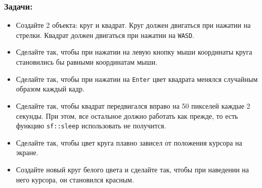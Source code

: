 \documentclass{article}
\begin{document}
\subsubsection*{Задачи:}
\begin{itemize}
\item Создайте 2 объекта: круг и квадрат. Круг должен двигаться при нажатии на стрелки. Квадрат должен двигаться при нажатии на \texttt{WASD}.
\item Сделайте так, чтобы при нажатии на левую кнопку мыши координаты круга становились бы равными координатам мыши.
\item Сделайте так, чтобы при нажатии на \texttt{Enter} цвет квадрата менялся случайным образом каждый кадр.
\item Сделайте так, чтобы квадрат передвигался вправо на 50 пикселей каждые 2 секунды. При этом, все остальное должно работать как прежде, то есть функцию \texttt{sf::sleep} использовать не получится.
\item Сделайте так, чтобы цвет круга плавно зависел от положения курсора на экране.

\item Создайте новый круг белого цвета и сделайте так, чтобы при наведении на него курсора, он становился красным.
\end{itemize}



\newpage
\end{document}

